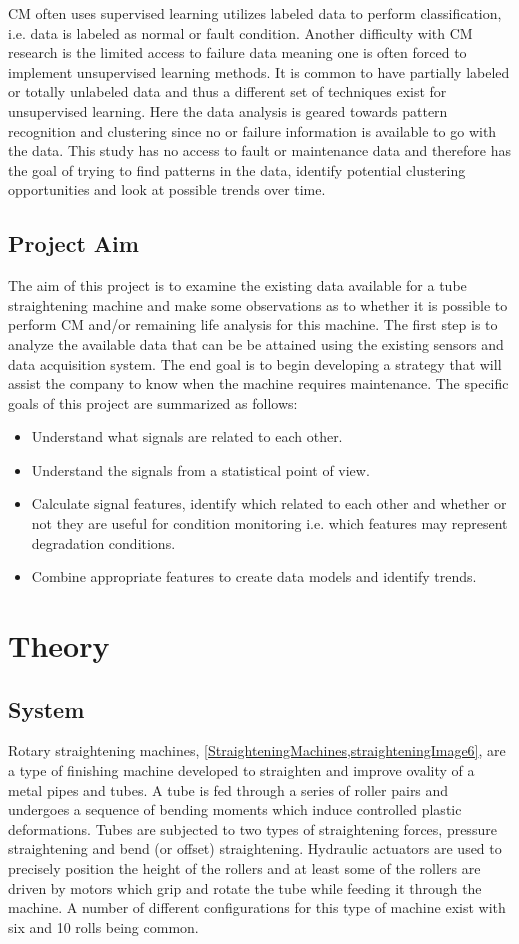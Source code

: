 \documentclass[]{article}
\begin{document}
\gls{CM} often uses supervised learning utilizes labeled data to perform classification, i.e. data is labeled as normal or fault condition. Another difficulty with \gls{CM} research is the limited access to failure data meaning one is often forced to implement unsupervised learning methods. It is common to have partially labeled or totally unlabeled data and thus a different set of techniques exist for unsupervised learning. Here the data analysis is geared towards pattern recognition and clustering since no or failure information is available to go with the data. This study has no access to fault or maintenance data and therefore has the goal of trying to find patterns in the data, identify potential clustering opportunities and look at possible trends over time.

\subsection{Project Aim}
The aim of this project is to examine the existing data available for a tube straightening machine and make some observations as to whether it is possible to perform \gls{CM} and/or remaining life analysis for this machine. The first step is to analyze the available data that can be be attained using the existing sensors and data acquisition system. The end goal is to begin developing a strategy that will assist the company to know when the machine requires maintenance. The specific goals of this project are summarized as follows:
\begin{itemize}
\item Understand what signals are related to each other.
\item Understand the signals from a statistical point of view.
\item Calculate signal features, identify which related to each other and whether or not they are useful for condition monitoring i.e. which features may represent degradation conditions.
\item Combine appropriate features to create data models and identify trends.
\end{itemize}
\clearpage  
\section{Theory}
\subsection{System}
Rotary straightening machines, \cref{StraighteningMachines,straighteningImage6}, are a type of finishing machine developed to straighten and improve ovality of a metal pipes and tubes. A tube is fed through a series of roller pairs and undergoes a sequence of bending moments which induce controlled plastic deformations. Tubes are subjected to two types of straightening forces, pressure straightening and bend (or offset) straightening. Hydraulic actuators are used to precisely position the height of the rollers and at least some of the rollers are driven by motors which grip and rotate the tube while feeding it through the machine. A number of different configurations for this type of machine exist with six and 10 rolls being common. 
\end{document}
